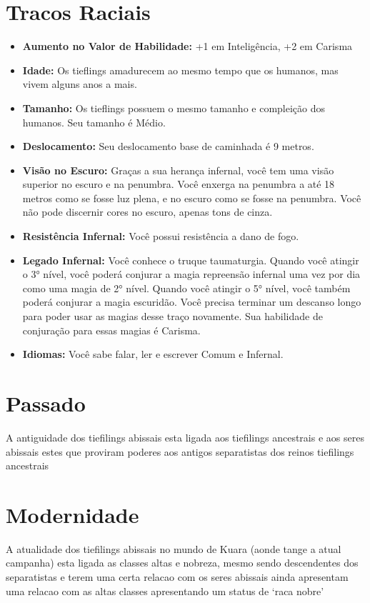 \documentclass{book}
\begin{document}
\section{Tracos Raciais}
\begin{itemize}
    \item \textbf{Aumento no Valor de Habilidade:} +1 em Inteligência, +2 em Carisma
    \item \textbf{Idade:} Os tieflings amadurecem ao mesmo tempo que os humanos, mas vivem 
          alguns anos a mais.
    \item \textbf{Tamanho:} Os tieflings possuem o mesmo tamanho e compleição dos humanos. 
          Seu tamanho é Médio.
    \item \textbf{Deslocamento:} Seu deslocamento base de caminhada é 9 metros.
    \item \textbf{Visão no Escuro:} Graças a sua herança infernal, você tem uma visão superior 
          no escuro e na penumbra. Você enxerga na penumbra a até 18 metros como se fosse 
          luz plena, e no escuro como se fosse na penumbra. Você não pode discernir cores 
          no escuro, apenas tons de cinza.
    \item \textbf{Resistência Infernal:} Você possui resistência a dano de fogo.
    \item \textbf{Legado Infernal:} Você conhece o truque taumaturgia. Quando você atingir o
          3° nível, você poderá conjurar a magia repreensão infernal uma vez por dia
          como uma magia de 2° nível. Quando você atingir o 5° nível, você também poderá 
          conjurar a magia escuridão. Você precisa terminar um descanso longo para poder usar
          as magias desse traço novamente. Sua habilidade de conjuração para essas magias é 
          Carisma.
    \item \textbf{Idiomas:} Você sabe falar, ler e escrever Comum e Infernal.
\end{itemize}
\section{Passado}
A antiguidade dos tiefilings abissais esta ligada aos tiefilings ancestrais e aos seres 
abissais estes que proviram poderes aos antigos separatistas dos reinos tiefilings ancestrais
\section{Modernidade}
A atualidade dos tiefilings abissais no mundo de Kuara (aonde tange a atual campanha) esta 
ligada as classes altas e nobreza, mesmo sendo descendentes dos separatistas e terem uma certa 
relacao com os seres abissais ainda apresentam uma relacao com as altas classes apresentando 
um status de `raca nobre'
\end{document}
